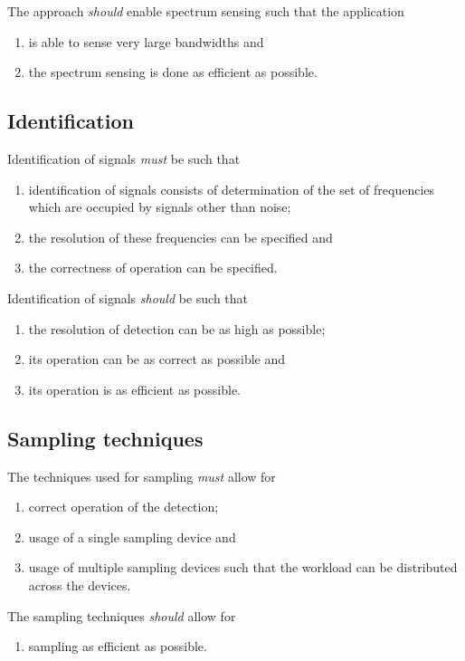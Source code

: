\documentclass[a4paper, openany, oneside]{memoir}
\begin{document}
The approach \emph{should} enable spectrum sensing such that the application
\begin{enumerate}
    \item is able to sense very large bandwidths and
    \item the spectrum sensing is done as efficient as possible.
\end{enumerate}

\subsection{Identification}
Identification of signals \emph{must} be such that
\begin{enumerate}
    \item identification of signals consists of determination of the set of frequencies which are occupied by signals other than noise;
    \item the resolution of these frequencies can be specified and
    \item the correctness of operation can be specified.
\end{enumerate}
Identification of signals \emph{should} be such that
\begin{enumerate}
    \item the resolution of detection can be as high as possible;
    \item its operation can be as correct as possible and
    \item its operation is as efficient as possible.
\end{enumerate}

\subsection{Sampling techniques}
The techniques used for sampling \emph{must} allow for
\begin{enumerate}
    \item correct operation of the detection;
    \item usage of a single sampling device and
    \item usage of multiple sampling devices such that the workload can be distributed across the devices.
\end{enumerate}

The sampling techniques \emph{should} allow for
\begin{enumerate}
    \item sampling as efficient as possible.
\end{enumerate}
\end{document}

